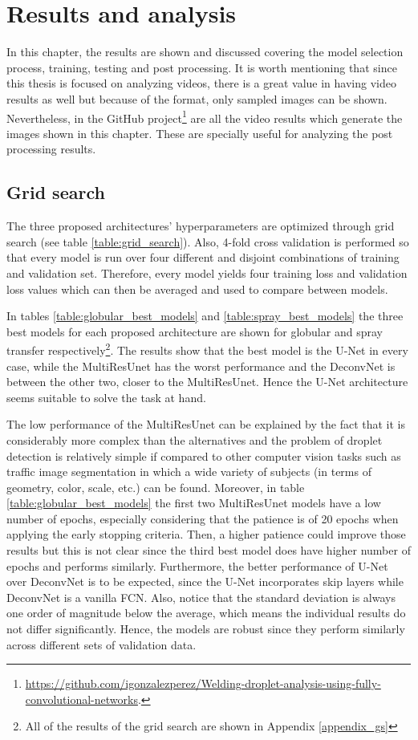 \chapter{Results and analysis}\label{chap:results}
In this chapter, the results are shown and discussed covering the model selection process, training, testing and post processing. It is worth mentioning that since this thesis is focused on analyzing videos, there is a great value in having video results as well but because of the format, only sampled images can be shown. Nevertheless, in the GitHub project\footnote{\url{https://github.com/igonzalezperez/Welding-droplet-analysis-using-fully-convolutional-networks}.} are all the video results which generate the images shown in this chapter. These are specially useful for analyzing the post processing results.


\section{Grid search}
The three proposed architectures' hyperparameters are optimized through grid search (see table \ref{table:grid_search}). Also, 4-fold cross validation is performed so that every model is run over four different and disjoint combinations of training and validation set. Therefore, every model yields four training loss and validation loss values which can then be averaged and used to compare between models. 

In tables \ref{table:globular_best_models} and \ref{table:spray_best_models} the three best models for each proposed architecture are shown for globular and spray transfer respectively\footnote{All of the results of the grid search are shown in Appendix \ref{appendix_gs}}. The results show that the best model is the U-Net in every case, while the MultiResUnet has the worst performance and the DeconvNet is between the other two, closer to the MultiResUnet. Hence the U-Net architecture seems suitable to solve the task at hand. 

The low performance of the MultiResUnet can be explained by the fact that it is considerably more complex than the alternatives and the problem of droplet detection is relatively simple if compared to other computer vision tasks such as traffic image segmentation in which a wide variety of subjects (in terms of geometry, color, scale, etc.) can be found. Moreover, in table \ref{table:globular_best_models} the first two MultiResUnet models have a low number of epochs, especially considering that the patience is of 20 epochs when applying the early stopping criteria. Then, a higher patience could improve those results but this is not clear since the third best model does have higher number of epochs and performs similarly. Furthermore, the better performance of U-Net over DeconvNet is to be expected, since the U-Net incorporates skip layers while DeconvNet is a vanilla FCN. Also, notice that the standard deviation is always one order of magnitude below the average, which means the individual results do not differ significantly. Hence, the models are robust since they perform similarly across different sets of validation data.


